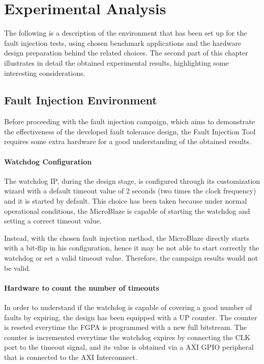 \chapter{Experimental Analysis}
\label{sec:exp}

The following is a description of the environment that has been set up for the fault injection tests, using chosen benchmark applications and the hardware design preparation behind the related choices. The second part of this chapter illustrates in detail the obtained experimental results, highlighting some interesting considerations.

\section{Fault Injection Environment}

Before proceeding with the fault injection campaign, which aims to demonstrate the effectiveness of the developed fault tolerance design, the Fault Injection Tool requires some extra hardware for a good understanding of the obtained results.

\subsubsection{Watchdog Configuration}
The watchdog IP, during the design stage, is configured through its customization wizard with a default timeout value of 2 seconds (two times the clock frequency) and it is started by default. This choice has been taken because under normal operational conditions, the MicroBlaze is capable of starting the watchdog and setting a correct timeout value.\bigskip
 
Instead, with the chosen fault injection method, the MicroBlaze directly starts with a bit-flip in his configuration, hence it may be not able to start correctly the watchdog or set a valid timeout value. Therefore, the campaign results would not be valid.\bigskip

\subsubsection{Hardware to count the number of timeouts}
In order to understand if the watchdog is capable of covering a good number of faults by expiring, the design has been equipped with a UP counter. The counter is reseted everytime the FGPA is programmed with a new full bitstream. The counter is incremented everytime the watchdog expires by connecting the CLK port to the timeout signal, and its value is obtained via a AXI GPIO peripheral that is connected to the AXI Interconnect. \bigskip

